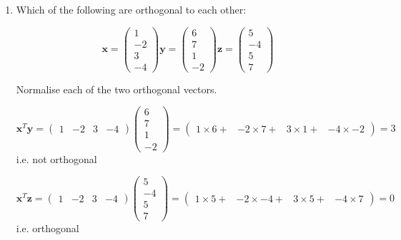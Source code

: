 \documentclass{article}
\begin{document}
\begin{enumerate}
\item Which of the following are orthogonal to each other:

\begin{displaymath}
\boldsymbol{x} = \left( \begin{array}{r} 1 \\ -2 \\ 3 \\ -4 \end{array} \right)
\boldsymbol{y} = \left( \begin{array}{r} 6 \\ 7 \\ 1 \\ -2 \end{array} \right)
\boldsymbol{z} = \left( \begin{array}{r} 5 \\ -4 \\ 5 \\ 7 \end{array} \right)
\end{displaymath}

Normalise each of the two orthogonal vectors.


\begin{displaymath}
\boldsymbol{x}^{T}\boldsymbol{y} = \left( \begin{array}{rrrr}1 & -2 & 3 & -4 \end{array} \right) \left( \begin{array}{r} 6 \\ 7 \\ 1 \\ -2 \end{array} \right) = \left( \begin{array}{rrrr} 1 \times 6 + & -2 \times 7 + & 3 \times 1 + & -4 \times -2 \end{array} \right) = 3
\end{displaymath}
i.e. not orthogonal

\begin{displaymath}
\boldsymbol{x}^{T}\boldsymbol{z} = \left( \begin{array}{rrrr}1 & -2 & 3 & -4 \end{array} \right) \left( \begin{array}{r} 5 \\ -4 \\ 5 \\ 7 \end{array} \right) = \left( \begin{array}{rrrr} 1 \times 5 + & -2 \times -4 + & 3 \times 5 + & -4 \times 7 \end{array} \right) = 0
\end{displaymath}
i.e. orthogonal


\end{enumerate}
\end{document}
